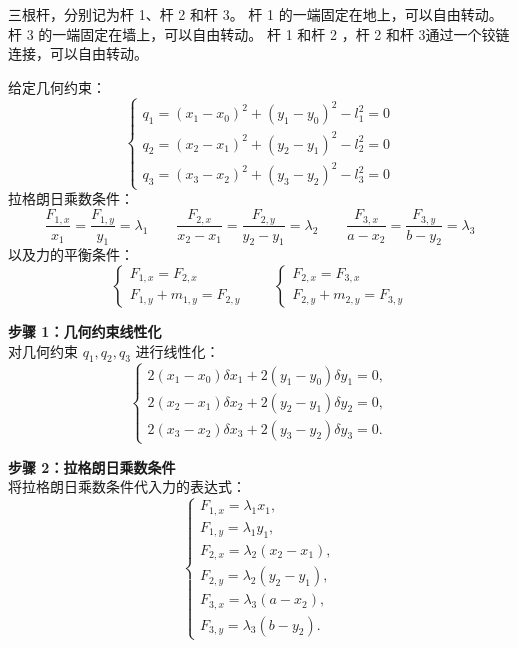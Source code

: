 \documentclass[12pt, a4paper, oneside, UTF8]{ctexbook}  %
\begin{document}
\begin{example}
三根杆，分别记为杆 1、杆 2 和杆 3。
杆 1 的一端固定在地上，可以自由转动。
杆 3 的一端固定在墙上，可以自由转动。
杆 1 和杆 2 ，杆 2 和杆 3通过一个铰链连接，可以自由转动。

    给定几何约束：
    \[
    \begin{cases}
    q_1 = (x_1 - x_0)^2 + (y_1 - y_0)^2 - l_1^2 = 0 \\
    q_2 = (x_2 - x_1)^2 + (y_2 - y_1)^2 - l_2^2 = 0 \\
    q_3 = (x_3 - x_2)^2 + (y_3 - y_2)^2 - l_3^2 = 0
    \end{cases}
    \]
    拉格朗日乘数条件：
    \[
    \frac{F_{1,x}}{x_1} = \frac{F_{1,y}}{y_1} = \lambda_1 \qquad
    \frac{F_{2,x}}{x_2 - x_1} = \frac{F_{2,y}}{y_2 - y_1} = \lambda_2 \qquad
    \frac{F_{3,x}}{a - x_2} = \frac{F_{3,y}}{b - y_2} = \lambda_3
    \]
    以及力的平衡条件：
    \[
    \begin{cases}
    F_{1,x} = F_{2,x} \\
    F_{1,y} + m_{1,y} = F_{2,y}
    \end{cases}
    \qquad
    \begin{cases}
    F_{2,x} = F_{3,x} \\
    F_{2,y} + m_{2,y} = F_{3,y}
    \end{cases}
    \]
\begin{solution}
    \noindent \textbf{步骤 1：几何约束线性化} \\
    对几何约束 \( q_1, q_2, q_3 \) 进行线性化：
    \[
    \begin{cases}
    2(x_1 - x_0) \delta x_1 + 2(y_1 - y_0) \delta y_1 = 0, \\
    2(x_2 - x_1) \delta x_2 + 2(y_2 - y_1) \delta y_2 = 0, \\
    2(x_3 - x_2) \delta x_3 + 2(y_3 - y_2) \delta y_3 = 0.
    \end{cases}
    \]

    \noindent \textbf{步骤 2：拉格朗日乘数条件} \\
    将拉格朗日乘数条件代入力的表达式：
    \[
    \begin{cases}
    F_{1,x} = \lambda_1 x_1, \\
    F_{1,y} = \lambda_1 y_1, \\
    F_{2,x} = \lambda_2 (x_2 - x_1), \\
    F_{2,y} = \lambda_2 (y_2 - y_1), \\
    F_{3,x} = \lambda_3 (a - x_2), \\
    F_{3,y} = \lambda_3 (b - y_2).
    \end{cases}
    \]
    

\end{solution}
\end{example}
\end{document}
